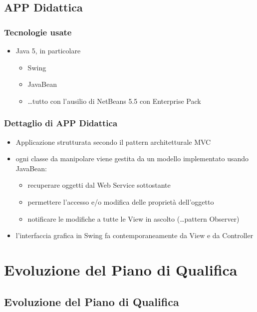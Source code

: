 \subsection{APP Didattica}

\begin{frame}
\frametitle{Tecnologie usate}

\begin{itemize}
\item Java 5, in particolare

\begin{itemize}
\item Swing
\item JavaBean
\item \ldots tutto con l'ausilio di NetBeans 5.5 con Enterprise Pack
\end{itemize}

\end{itemize}
\end{frame}

\begin{frame}
\frametitle{Dettaglio di APP Didattica}

\begin{itemize}
\item Applicazione strutturata secondo il pattern architetturale MVC
\item ogni classe da manipolare viene gestita da un modello implementato usando JavaBean:
\begin{itemize}
 \item recuperare oggetti dal Web Service sottostante
 \item permettere l'accesso e/o modifica delle proprietà dell'oggetto
 \item notificare le modifiche a tutte le View in ascolto (\ldots pattern Observer)
\end{itemize}

\item l'interfaccia grafica in Swing fa contemporaneamente da View e da Controller
\end{itemize}

\end{frame}


\section{Evoluzione del Piano di Qualifica}

\subsection*{Evoluzione del Piano di Qualifica}

